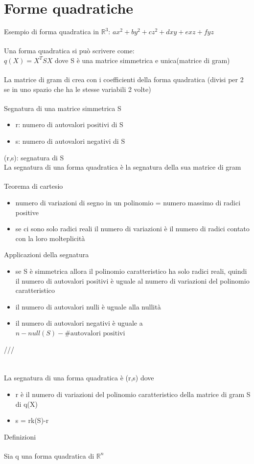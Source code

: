 \documentclass{article}
\begin{document}
\section{Forme quadratiche}
Esempio di forma quadratica in \(\mathbb{R}^3\): \(ax^2+by^2+cz^2+dxy+exz+fyz\)\\\\
Una forma quadratica si può scrivere come:\\
\(q(X)= X^TSX\) dove S è una matrice simmetrica e unica(matrice di gram)\\\\
La matrice di gram di crea con i coefficienti della forma quadratica (divisi per 2 se in uno spazio che ha le stesse variabili 2 volte)\\\\
{\large Segnatura di una matrice simmetrica S}
\begin{itemize}
    \item r: numero di autovalori positivi di S
    \item s: numero di autovalori negativi di S
\end{itemize}
(r,s): segnatura di S\\
La segnatura di una forma quadratica è la segnatura della sua matrice di gram\\\\
{\large Teorema di cartesio}
\begin{itemize}
    \item numero di variazioni di segno in un polinomio = numero massimo di radici positive
    \item se ci sono solo radici reali il numero di variazioni è il numero di radici contato con la loro molteplicità
\end{itemize}
{\large Applicazioni della segnatura}
\begin{itemize}
    \item se S è simmetrica allora il polinomio caratteristico ha solo radici reali, quindi il numero di autovalori positivi è uguale al numero di variazioni del polinomio caratteristico
    \item il numero di autovalori nulli è uguale alla nullità
    \item il numero di autovalori negativi è uguale a \(n-null(S)-\#\text{autovalori positivi}\)
\end{itemize}
///\\\\\\
La segnatura di una forma quadratica è (r,s) dove
\begin{itemize}
    \item r è il numero di variazioni del polinomio caratteristico della matrice di gram S di q(X)
    \item s = rk(S)-r
\end{itemize}
{\large Definizioni}\\\\
Sia q una forma quadratica di \(\mathbb{R}^n\)
\end{document}
